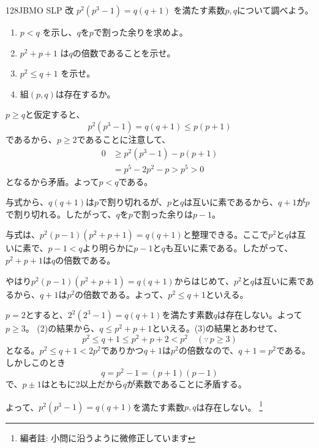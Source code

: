 \begin{prob}{128}{}{JBMO SLP 改}
 $p^2(p^3-1)=q(q+1)$ を満たす素数$p, q$について調べよう。
 \begin{enumerate}
  \item $p<q$ を示し、$q$を$p$で割った余りを求めよ。
  \item $p^2+p+1$ は$q$の倍数であることを示せ。
  \item $p^2\le q+1$ を示せ。
  \item 組$(p,q)$は存在するか。
 \end{enumerate}
\end{prob}
$p\ge q$と仮定すると、
\[ p^2(p^3-1)=q(q+1)\le p(p+1) \]
であるから、$p\ge 2$であることに注意して、
\begin{align*}
 0&\ge p^2(p^3-1)-p(p+1) \\
  &= p^5-2p^2-p > p^5 > 0
\end{align*}
となるから矛盾。よって$p<q$である。

与式から、$q(q+1)$は$p$で割り切れるが、$p$と$q$は互いに素であるから、$q+1$が$p$で割り切れる。したがって、$q$を$p$で割った余りは$p-1$。

与式は、$p^2(p-1)(p^2+p+1)=q(q+1)$と整理できる。ここで$p^2$と$q$は互いに素で、$p-1<q$より明らかに$p-1$と$q$も互いに素である。したがって、$p^2+p+1$は$q$の倍数である。

やはり$p^2(p-1)(p^2+p+1)=q(q+1)$からはじめて、$p^2$と$q$は互いに素であるから、$q+1$は$p^2$の倍数である。よって、$p^2\le q+1$といえる。

$p=2$とすると、$2^2(2^3-1)=q(q+1)$を満たす素数$q$は存在しない。よって$p\ge 3$。
(2)の結果から、$q\le p^2+p+1$といえる。(3)の結果とあわせて、
\[ p^2\le q+1\le p^2+p+2 < p^2 \quad (\because\, p\ge 3)\]
となる。$p^2\le q+1<2p^2$でありかつ$q+1$は$p^2$の倍数なので、$q+1=p^2$である。しかしこのとき
\[ q=p^2-1=(p+1)(p-1) \]
で、$p\pm 1$はともに2以上だから$q$が素数であることに矛盾する。

よって、$p^2(p^3-1)=q(q+1)$を満たす素数$p, q$は存在しない。
\footnote{編者註: 小問に沿うように微修正しています}